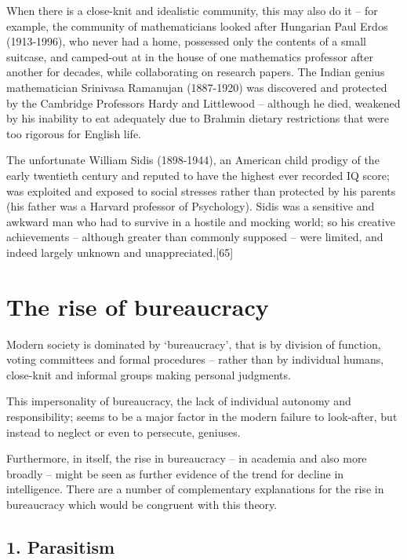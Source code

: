 \documentclass[
]{book}
\begin{document}
When there is a close-knit and idealistic community, this may also do it -- for example, the community of mathematicians looked after Hungarian Paul Erdos (1913-1996), who never had a home, possessed only the contents of a small suitcase, and camped-out at in the house of one mathematics professor after another for decades, while collaborating on research papers. The Indian genius mathematician Srinivasa Ramanujan (1887-1920) was discovered and protected by the Cambridge Professors Hardy and Littlewood -- although he died, weakened by his inability to eat adequately due to Brahmin dietary restrictions that were too rigorous for English life.

The unfortunate William Sidis (1898-1944), an American child prodigy of the early twentieth century and reputed to have the highest ever recorded IQ score; was exploited and exposed to social stresses rather than protected by his parents (his father was a Harvard professor of Psychology). Sidis was a sensitive and awkward man who had to survive in a hostile and mocking world; so his creative achievements -- although greater than commonly supposed -- were limited, and indeed largely unknown and unappreciated.{[}65{]}

\hypertarget{the-rise-of-bureaucracy}{%
\section{The rise of bureaucracy}\label{the-rise-of-bureaucracy}}

Modern society is dominated by `bureaucracy', that is by division of function, voting committees and formal procedures -- rather than by individual humans, close-knit and informal groups making personal judgments.

This impersonality of bureaucracy, the lack of individual autonomy and responsibility; seems to be a major factor in the modern failure to look-after, but instead to neglect or even to persecute, geniuses.

Furthermore, in itself, the rise in bureaucracy -- in academia and also more broadly -- might be seen as further evidence of the trend for decline in intelligence. There are a number of complementary explanations for the rise in bureaucracy which would be congruent with this theory.

\hypertarget{parasitism}{%
\subsection*{1. Parasitism}\label{parasitism}}
\end{document}
